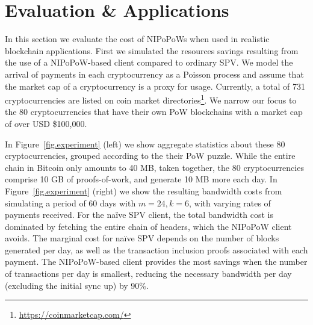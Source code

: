 \section{Evaluation \& Applications}
\label{sec:applications}
In this section we evaluate the cost of NIPoPoWs when used in realistic blockchain applications.
First we simulated the resources savings resulting from the use of a NIPoPoW-based
client compared to ordinary SPV. We model the arrival of payments in each cryptocurrency as a Poisson process
and assume that the market cap of a cryptocurrency is a proxy for usage. Currently,
a total of 731 cryptocurrencies are listed on coin market
directories\footnote{\url{https://coinmarketcap.com/}}. We narrow our focus to
the 80 cryptocurrencies that have their own PoW blockchains with
a market cap of over USD \$100,000.

In Figure~\ref{fig.experiment} (left) we show aggregate statistics about these 80
cryptocurrencies, grouped according to the their PoW puzzle. While the entire
chain in Bitcoin only amounts to 40 MB, taken together, the 80 cryptocurrencies
comprise 10 GB of proofs-of-work, and generate 10 MB more each day. In
Figure~\ref{fig.experiment} (right) we show the resulting bandwidth costs from simulating
a period of 60 days with $m=24, k=6$, with varying rates of payments received.
%
For the na\"ive SPV client, the total bandwidth cost is dominated by fetching
the entire chain of headers, which the NIPoPoW client avoids. The marginal
cost for na\"ive SPV depends on the number of blocks generated per day, as well
as the transaction inclusion proofs associated with each payment. The
NIPoPoW-based client provides the most savings when the number of transactions
per day is smallest, reducing the necessary bandwidth per day (excluding the
initial sync up) by 90\%.

